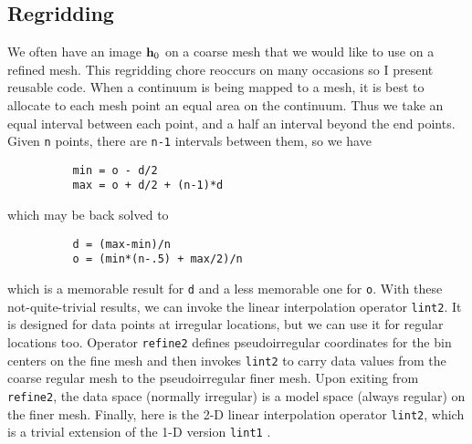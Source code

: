 \subsection{Regridding}


\par
We often have an image $\bold h_0$
on a coarse mesh that we would like to use on a refined mesh.
This regridding chore reoccurs on many occasions
so I present reusable code.
When a continuum is being mapped to a mesh,
it is best to allocate to each mesh point
an equal area on the continuum.
Thus we take an equal interval between each point,
and a half an interval beyond the end points.
Given {\tt n} points,
there are {\tt n-1} intervals between them,
so we have
\par\noindent\begin{verbatim}
          min = o - d/2
          max = o + d/2 + (n-1)*d
\end{verbatim}
\par\noindent
which may be back solved to
\par\noindent\begin{verbatim}
          d = (max-min)/n
          o = (min*(n-.5) + max/2)/n
\end{verbatim}
\par\noindent
which is a memorable result for {\tt d} and a less memorable one for {\tt o}.
With these not-quite-trivial results, we can invoke
the linear interpolation operator \texttt{lint2}.
It is designed for data points at irregular locations,
but we can use it for regular locations too.
Operator \texttt{refine2} defines pseudoirregular coordinates
for the bin centers on the fine mesh
and then invokes \texttt{lint2} to
carry data values from the coarse regular mesh to
the pseudoirregular finer mesh.
Upon exiting from \texttt{refine2},
the data space (normally irregular)
is a model space (always regular) on the finer mesh.
Finally, here is the 2-D linear interpolation operator \texttt{lint2},
which is a trivial extension of the 1-D version \texttt{lint1} .

